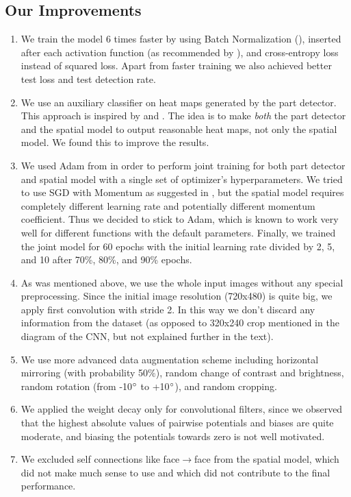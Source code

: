 \documentclass[a4paper,10pt]{article}
\begin{document}
	
	\subsection{Our Improvements}
	\begin{enumerate}
		\item We train the model 6 times faster by using Batch Normalization (\cite{ioffe2015batch}), inserted after each activation function (as recommended by \cite{mishkin2017systematic}), and cross-entropy loss instead of squared loss. Apart from faster training we also achieved better test loss and test detection rate.
		\item We use an auxiliary classifier on heat maps generated by the part detector. This approach is inspired by \cite{girshick2015fast} and \cite{conv_pose_machines}. The idea is to make \textit{both} the part detector and the spatial model to output reasonable heat maps, not only the spatial model. We found this to improve the results.
		\item We used Adam from \cite{adam} in order to perform joint training for both part detector and spatial model with a single set of optimizer's hyperparameters. We tried to use SGD with Momentum as suggested in \cite{cnn_pgm_for_hpe}, but the spatial model requires completely different learning rate and potentially different momentum coefficient. Thus we decided to stick to Adam, which is known to work very well for different functions with the default parameters. Finally, we trained the joint model for 60 epochs with the initial learning rate divided by 2, 5, and 10 after 70\%, 80\%, and 90\% epochs.
		\item As was mentioned above, we use the whole input images without any special preprocessing. Since the initial image resolution (720x480) is quite big, we apply first convolution with stride 2. In this way we don't discard any information from the dataset (as opposed to 320x240 crop mentioned in the diagram of the CNN, but not explained further in the text).	
		\item We use more advanced data augmentation scheme including horizontal mirroring (with probability 50\%), random change of contrast and brightness, random rotation (from -10$\degree$ to +10$\degree$), and random cropping.
		\item We applied the weight decay only for convolutional filters, since we observed that the highest absolute values of pairwise potentials and biases are quite moderate, and biasing the potentials towards zero is not well motivated.	
		\item We excluded self connections like face$\rightarrow$face from the spatial model, which did not make much sense to use and which did not contribute to the final performance.
	\end{enumerate}
\end{document}

